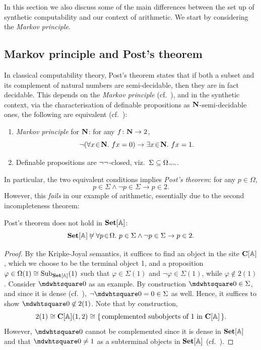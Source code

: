 In this section we also discuss some of the main differences between the set up of synthetic computability and our context of arithmetic. We start by considering the \emph{Markov principle}.

\subsection{Markov principle and Post's theorem}\label{subsec:post}

In classical computability theory, Post's theorem states that if both a subset and its complement of natural numbers are semi-decidable, then they are in fact decidable. This depends on the \emph{Markov principle} (cf.~\citet[\S3.5]{bauer_first_2006}), and in the synthetic context, via the characterisation of definable propositions as $\mathbf N$-semi-decidable ones, the following are equivalent (cf.~\citet[Prop.~3.17]{bauer_first_2006}):
\begin{enumerate}
  \item \emph{Markov principle} for $\mathbf N$: for any $f \colon \mathbf N \to 2$,
  \[ \neg(\forall x\!\in\!\mathbf N.\  fx = 0) \to \exists x\!\in\!\mathbf N.\  fx = 1. \]
  \item Definable propositions are $\neg\neg$-closed, viz.\ $\Sigma \subseteq \Omega_{\neg\neg}$.
\end{enumerate}
In particular, the two equivalent conditions implies \emph{Post's theorem}: for any $p\in\Omega$,
\[ p \in \Sigma \wedge \neg p \in \Sigma \to p \in 2. \]
However, this \emph{fails} in our example of arithmetic, essentially due to the second incompleteness theorem:

\begin{proposition}\label{prop:failureofpost}
  Post's theorem does not hold in $\mathbf{Set}[\mathbb{A}]$:
  \[ \mathbf{Set}[\mathbb{A}] \not\vDash \forall p\!\in\!\Omega.\  p \in \Sigma \wedge \neg p \in \Sigma \to p \in 2. \]
\end{proposition}
\begin{proof}
  By the Kripke-Joyal semantics, it suffices to find an object in the site $\mathbf{C}[\mathbb{A}]$, which we choose to be the terminal object 1, and a proposition $\varphi\in\Omega(1) \cong \mathrm{Sub}_{\mathbf{Set}[\mathbb{A}]}(1)$ such that $\varphi\in\Sigma(1)$ and $\neg\varphi\in\Sigma(1)$, while $\varphi\not\in 2(1)$. Consider $\bx 0$ as an example. By construction $\bx 0 \in \Sigma$, and since it is dense (cf.~), $\neg\bx 0 = 0\in\Sigma$ as well. Hence, it suffices to show $\bx 0 \not\in 2(1)$. Note that by construction,
  \[ 2(1) \cong \mathbf{C}[\mathbb{A}](1,2) \cong \{\,\text{complemented subobjects of 1 in $\mathbf{C}[\mathbb{A}]$}\,\}. \]
  However, $\bx 0$ cannot be complemented since it is dense in $\mathbf{Set}[\mathbb{A}]$ and that $\bx 0 \neq 1$ as a subterminal objects in $\mathbf{Set}[\mathbb{A}]$ (cf.~).
\end{proof}

